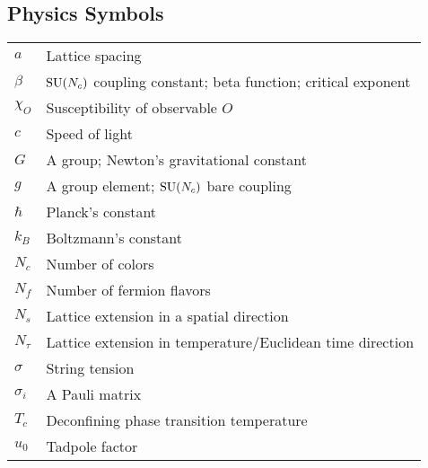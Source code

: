 \documentclass[12pt]{book}
\theoremstyle{definition}
\newenvironment{frontstuff}
  {\centering\chapter*{}}
  {\clearpage}
\begin{document}
\begin{frontstuff}
\section*{Physics Symbols}
\begin{tabular}{ll}
$a$             & Lattice spacing \\
$\beta$         & $\operatorname{SU}(N_c)$ coupling constant; beta function; critical exponent \\
$\chi_O$        & Susceptibility of observable $O$\\
$c$             & Speed of light\\
$G$             & A group; Newton's gravitational constant\\
$g$             & A group element; $\operatorname{SU}(N_c)$ bare coupling\\
$\hbar$         & Planck's constant \\
$k_B$           & Boltzmann's constant \\
$N_c$           & Number of colors \\
$N_f$           & Number of fermion flavors \\
$N_s$           & Lattice extension in a spatial direction \\
$N_\tau$        & Lattice extension in temperature/Euclidean time direction\\
$\sigma$        & String tension\\
$\sigma_i$      & A Pauli matrix\\
$T_c$           & Deconfining phase transition temperature\\
$u_0$           & Tadpole factor\\
\end{tabular}
\clearpage



\end{frontstuff}
\end{document}

